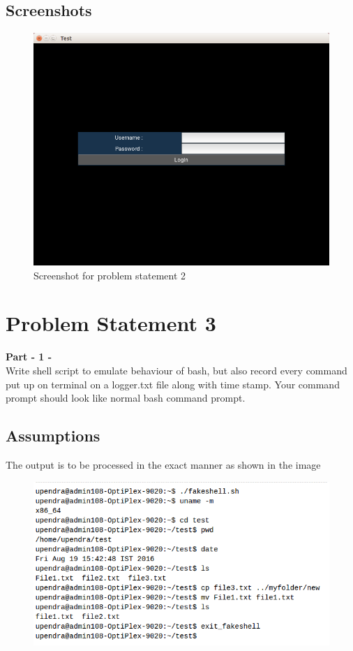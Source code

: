 \documentclass[11pt]{report}
\begin{document}
	\subsection{Screenshots}
	\begin{figure}[h!]
	\centering
	\includegraphics[scale=0.8, center]{images/screenshot2}
	\caption{Screenshot for problem statement 2}
	\end{figure}
	\pagebreak
\section{Problem Statement 3}
\textbf{Part - 1 -}\\
Write shell script to emulate behaviour of bash, but also record every command put up on terminal on a logger.txt file along with time stamp. Your command prompt should look like normal bash command prompt. \\
	\subsection{Assumptions}
	The output is to be processed in the exact manner as shown in the image\\
	\begin{figure}[h!]
	\centering
	\includegraphics[scale=0.7]{images/Selection_004}	
	\end{figure}
	\pagebreak
\end{document}
